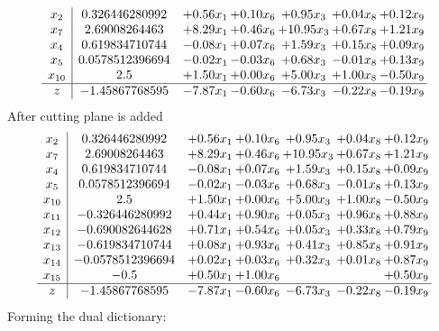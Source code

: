 \documentclass[8pt]{article}
\begin{document}
\[\begin{array}{c| c c@{\hskip 2pt} c@{\hskip 2pt} c@{\hskip 2pt} c@{\hskip 2pt} c@{\hskip 2pt} }
 x_{2}   &  0.326446280992 & +  0.56 x_{1} & +  0.10 x_{6} & +  0.95 x_{3} & +  0.04 x_{8} & +  0.12 x_{9}\\
 x_{7}   &  2.69008264463 & +  8.29 x_{1} & +  0.46 x_{6} & + 10.95 x_{3} & +  0.67 x_{8} & +  1.21 x_{9}\\
 x_{4}   &  0.619834710744 & -0.08 x_{1} & +  0.07 x_{6} & +  1.59 x_{3} & +  0.15 x_{8} & +  0.09 x_{9}\\
 x_{5}   &  0.0578512396694 & -0.02 x_{1} & -0.03 x_{6} & +  0.68 x_{3} & -0.01 x_{8} & +  0.13 x_{9}\\
 x_{10}   &  2.5 & +  1.50 x_{1} & +  0.00 x_{6} & +  5.00 x_{3} & +  1.00 x_{8} & -0.50 x_{9}\\
\hline
z    &  -1.45867768595 & -7.87 x_{1} & -0.60 x_{6} & -6.73 x_{3} & -0.22 x_{8} & -0.19 x_{9}\\
\end{array}\]
 After cutting plane is added 
\[\begin{array}{c| c c@{\hskip 2pt} c@{\hskip 2pt} c@{\hskip 2pt} c@{\hskip 2pt} c@{\hskip 2pt} }
 x_{2}   &  0.326446280992 & +  0.56 x_{1} & +  0.10 x_{6} & +  0.95 x_{3} & +  0.04 x_{8} & +  0.12 x_{9}\\
 x_{7}   &  2.69008264463 & +  8.29 x_{1} & +  0.46 x_{6} & + 10.95 x_{3} & +  0.67 x_{8} & +  1.21 x_{9}\\
 x_{4}   &  0.619834710744 & -0.08 x_{1} & +  0.07 x_{6} & +  1.59 x_{3} & +  0.15 x_{8} & +  0.09 x_{9}\\
 x_{5}   &  0.0578512396694 & -0.02 x_{1} & -0.03 x_{6} & +  0.68 x_{3} & -0.01 x_{8} & +  0.13 x_{9}\\
 x_{10}   &  2.5 & +  1.50 x_{1} & +  0.00 x_{6} & +  5.00 x_{3} & +  1.00 x_{8} & -0.50 x_{9}\\
 x_{11}   &  -0.326446280992 & +  0.44 x_{1} & +  0.90 x_{6} & +  0.05 x_{3} & +  0.96 x_{8} & +  0.88 x_{9}\\
 x_{12}   &  -0.690082644628 & +  0.71 x_{1} & +  0.54 x_{6} & +  0.05 x_{3} & +  0.33 x_{8} & +  0.79 x_{9}\\
 x_{13}   &  -0.619834710744 & +  0.08 x_{1} & +  0.93 x_{6} & +  0.41 x_{3} & +  0.85 x_{8} & +  0.91 x_{9}\\
 x_{14}   &  -0.0578512396694 & +  0.02 x_{1} & +  0.03 x_{6} & +  0.32 x_{3} & +  0.01 x_{8} & +  0.87 x_{9}\\
 x_{15}   &  -0.5 & +  0.50 x_{1} & +  1.00 x_{6} &    &   & +  0.50 x_{9}\\
\hline
z    &  -1.45867768595 & -7.87 x_{1} & -0.60 x_{6} & -6.73 x_{3} & -0.22 x_{8} & -0.19 x_{9}\\
\end{array}\]
Forming the dual dictionary:
\end{document}
